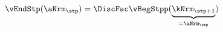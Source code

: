   \begin{equation}\begin{gathered}\begin{aligned}
\vEndStp(\aNrm_{\stp}) & = \DiscFac \vBegStpp(\underbrace{\kNrm_{\stp+1}}_{=\aNrm_{\stp}}) \label{eq:vEndStp}
      \end{aligned}\end{gathered}\end{equation}
